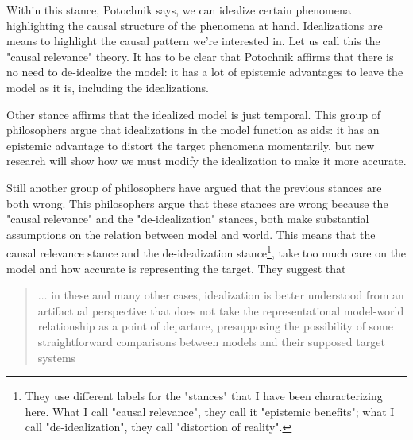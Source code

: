 Within this stance, Potochnik says, we can idealize certain phenomena highlighting the causal structure of the phenomena at hand.
Idealizations are means to highlight the causal pattern we're interested in.
Let us call this the "causal relevance" theory.
It has to be clear that Potochnik affirms that there is no need to de-idealize the model: it has a lot of epistemic advantages to leave the model as it is, including the idealizations.

Other stance affirms that the idealized model is just temporal.
This group of philosophers argue that idealizations in the model function as aids: it has an epistemic advantage to distort the target phenomena momentarily, but new research will show how we must modify the idealization to make it more accurate.

Still another group of philosophers have argued that the previous stances are both wrong.
This philosophers argue that these stances are wrong because the "causal relevance" and the "de-idealization" stances, both make substantial assumptions on the relation between model and world.
This means that the causal relevance stance and the de-idealization stance\footnote{They use different labels for the "stances" that I have been characterizing here. What I call "causal relevance", they call it "epistemic benefits"; what I call "de-idealization", they call "distortion of reality".}, take too much care on the model and how accurate is representing the target.
They suggest that

\begin{quote}
	$\ldots$ in these and many other cases, idealization is better understood from an artifactual perspective that does not take the representational model-world relationship as a point of departure, presupposing the possibility of some straightforward comparisons between models and their supposed target systems %
\end{quote}

